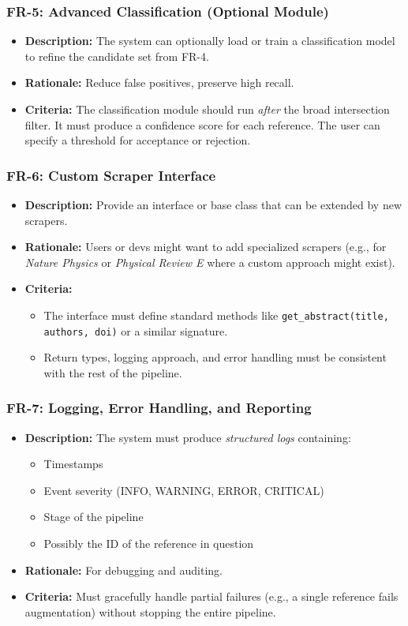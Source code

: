 \documentclass[12pt]{article}
\begin{document}
\subsubsection{FR-5: Advanced Classification (Optional Module)}
\begin{itemize}
  \item \textbf{Description:} The system can optionally load or train a classification model to refine the candidate set from FR-4. 
  \item \textbf{Rationale:} Reduce false positives, preserve high recall. 
  \item \textbf{Criteria:} The classification module should run \emph{after} the broad intersection filter. It must produce a confidence score for each reference. The user can specify a threshold for acceptance or rejection.
\end{itemize}

\subsubsection{FR-6: Custom Scraper Interface}
\begin{itemize}
  \item \textbf{Description:} Provide an interface or base class that can be extended by new scrapers. 
  \item \textbf{Rationale:} Users or devs might want to add specialized scrapers (e.g., for \emph{Nature Physics} or \emph{Physical Review E} where a custom approach might exist).
  \item \textbf{Criteria:}
  \begin{itemize}
    \item The interface must define standard methods like \verb|get_abstract(title, authors, doi)| or a similar signature.
    \item Return types, logging approach, and error handling must be consistent with the rest of the pipeline.
  \end{itemize}
\end{itemize}

\subsubsection{FR-7: Logging, Error Handling, and Reporting}
\begin{itemize}
  \item \textbf{Description:} The system must produce \emph{structured logs} containing:
  \begin{itemize}
    \item Timestamps
    \item Event severity (INFO, WARNING, ERROR, CRITICAL)
    \item Stage of the pipeline
    \item Possibly the ID of the reference in question
  \end{itemize}
  \item \textbf{Rationale:} For debugging and auditing.
  \item \textbf{Criteria:} Must gracefully handle partial failures (e.g., a single reference fails augmentation) without stopping the entire pipeline. 
\end{itemize}
\end{document}
